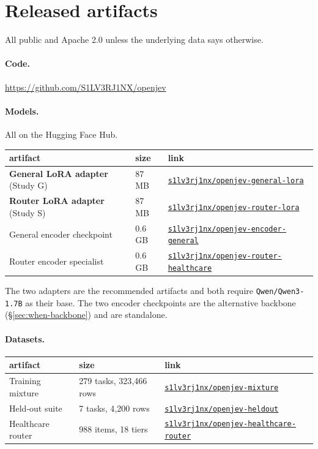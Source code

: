 \section{Released artifacts}
\label{app:artifacts}

All public and Apache 2.0 unless the underlying data says otherwise.

\paragraph{Code.} \url{https://github.com/S1LV3RJ1NX/openjev}

\paragraph{Models.} All on the Hugging Face Hub.
\begin{center}
\small
\begin{tabular}{llp{6.6cm}}
\toprule
artifact & size & link \\
\midrule
\textbf{General LoRA adapter} (Study G) & 87 MB &
  \href{https://huggingface.co/s1lv3rj1nx/openjev-general-lora}{\texttt{s1lv3rj1nx/openjev-general-lora}} \\
\textbf{Router LoRA adapter} (Study S) & 87 MB &
  \href{https://huggingface.co/s1lv3rj1nx/openjev-router-lora}{\texttt{s1lv3rj1nx/openjev-router-lora}} \\
General encoder checkpoint & 0.6 GB &
  \href{https://huggingface.co/s1lv3rj1nx/openjev-encoder-general}{\texttt{s1lv3rj1nx/openjev-encoder-general}} \\
Router encoder specialist & 0.6 GB &
  \href{https://huggingface.co/s1lv3rj1nx/openjev-router-healthcare}{\texttt{s1lv3rj1nx/openjev-router-healthcare}} \\
\bottomrule
\end{tabular}
\end{center}

The two adapters are the recommended artifacts and both require
\texttt{Qwen/Qwen3-1.7B} as their base. The two encoder checkpoints are
the alternative backbone (\S\ref{sec:when-backbone}) and are standalone.

\paragraph{Datasets.}
\begin{center}
\small
\begin{tabular}{llp{6.2cm}}
\toprule
artifact & size & link \\
\midrule
Training mixture & 279 tasks, 323{,}466 rows &
  \href{https://huggingface.co/datasets/s1lv3rj1nx/openjev-mixture}{\texttt{s1lv3rj1nx/openjev-mixture}} \\
Held-out suite & 7 tasks, 4{,}200 rows &
  \href{https://huggingface.co/datasets/s1lv3rj1nx/openjev-heldout}{\texttt{s1lv3rj1nx/openjev-heldout}} \\
Healthcare router & 988 items, 18 tiers &
  \href{https://huggingface.co/datasets/s1lv3rj1nx/openjev-healthcare-router}{\texttt{s1lv3rj1nx/openjev-healthcare-router}} \\
\bottomrule
\end{tabular}
\end{center}


